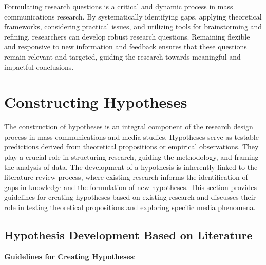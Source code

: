 \documentclass[
]{book}
\begin{document}
Formulating research questions is a critical and dynamic process in mass communications research. By systematically identifying gaps, applying theoretical frameworks, considering practical issues, and utilizing tools for brainstorming and refining, researchers can develop robust research questions. Remaining flexible and responsive to new information and feedback ensures that these questions remain relevant and targeted, guiding the research towards meaningful and impactful conclusions.

\hypertarget{constructing-hypotheses}{%
\section*{Constructing Hypotheses}\label{constructing-hypotheses}}

The construction of hypotheses is an integral component of the research design process in mass communications and media studies. Hypotheses serve as testable predictions derived from theoretical propositions or empirical observations. They play a crucial role in structuring research, guiding the methodology, and framing the analysis of data. The development of a hypothesis is inherently linked to the literature review process, where existing research informs the identification of gaps in knowledge and the formulation of new hypotheses. This section provides guidelines for creating hypotheses based on existing research and discusses their role in testing theoretical propositions and exploring specific media phenomena.

\hypertarget{hypothesis-development-based-on-literature}{%
\subsection*{Hypothesis Development Based on Literature}\label{hypothesis-development-based-on-literature}}

\textbf{Guidelines for Creating Hypotheses}:
\end{document}
